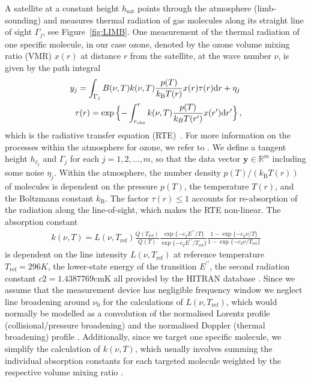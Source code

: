 A satellite at a constant height $h_{\text{sat}}$ points through the atmosphere (limb-sounding) and measures thermal radiation of gas molecules along its straight line of sight $\Gamma_j$, see  Figure~\ref{fig:LIMB}.
One measurement of the thermal radiation of one specific molecule, in our case ozone, denoted by the ozone volume mixing ratio (VMR) $x(r)$ at distance $r$ from the satellite, at the wave number $\nu$, is given by the path integral
\begin{align}
	\label{eq:RTE} 
	y_j =   \int_{\Gamma_j}  B(\nu,T) k(\nu, T)   \frac{p(T)}{k_{\text{B}} T(r)}  x(r)  \tau(r) \text{d}r + \eta_j \, \\
	\tau(r) = \exp{ \Bigl\{ - \int^{r}_{r_\text{obs}}  k(\nu, T)   \frac{p(T)}{k_B T(r^{\prime})}  x(r^{\prime}) \text{d}r^{\prime} \Bigr\} } \, ,\label{eq:absRTE} 
\end{align}
which is the radiative transfer equation (RTE)~\cite{mipas2000handbook}.
For more information on the processes within the atmosphere for ozone, we refer to \cite{Lee2020NightOzone}.
We define a tangent height $h_{\ell_j}$ and $\Gamma_j$ for each $j=1,2,\ldots,m$, so that the data vector $\bm{y} \in \mathbb{R}^m$ including some noise $\eta_j$.
Within the atmosphere, the number density $p(T) / (k_{\text{B}} T(r))$ of molecules is dependent on the pressure $p(T)$, the temperature $T(r)$, and the Boltzmann constant $k_{\text{B}}$.
The factor $\tau(r)\leq 1$ accounts for re-absorption of the radiation along the line-of-sight, which makes the RTE non-linear.
The absorption constant
\begin{align}
	k(\nu, T) = L(\nu, T_{\text{ref}}) \frac{Q(T_{\text{ref}})}{Q(T)} \frac{ \exp{\{ - c_2 E^{\prime \prime} / T\}} }{\exp{\{ - c_2 E^{\prime \prime} / T_{\text{ref}} \}}} \frac{ 1- \exp{\{ - c_2 \nu  / T \}} }{1 - \exp{\{ - c_2 \nu / T_{\text{ref}} \}}}
\end{align}
is dependent on the line intensity $L(\nu, T_{\text{ref}})$ at reference temperature $T_{\text{ref}} =296K $, the lower-state energy of the transition $ E^{\prime \prime} $, the second radiation constant $c2=1.4387769\text{cmK}$ all provided by the HITRAN database \cite{gordon2022hitran2020}.
Since we assume that the measurement device has negligible frequency window we neglect line broadening around $\nu_0$ for the calculations of $L(\nu, T_{\text{ref}})$, which would normally be modelled as a convolution of the normalised Lorentz profile (collisional/pressure broadening) and the normalised Doppler (thermal broadening) profile \cite{mipas2000handbook}.
Additionally, since we target one specific molecule, we simplify the calculation of $k(\nu, T)$, which usually involves summing the individual absorption constants for each targeted molecule weighted by the respective volume mixing ratio \cite{mipas2000handbook}.
